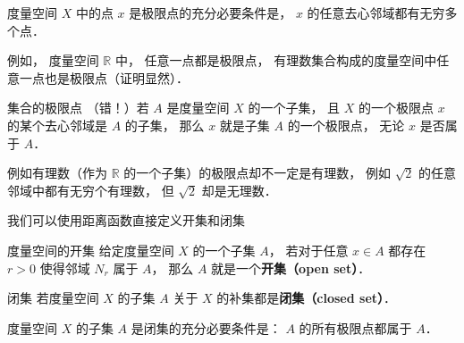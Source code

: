 \begin{corollary}{}
度量空间 $X$ 中的点 $x$ 是极限点的充分必要条件是， $x$ 的任意去心邻域都有无穷多个点．
\end{corollary}

例如， 度量空间 $\mathbb R$ 中， 任意一点都是极限点， 有理数集合构成的度量空间中任意一点也是极限点（证明显然）．

\begin{definition}{集合的极限点}
（错！）若 $A$ 是度量空间 $X$ 的一个子集， 且 $X$ 的一个极限点 $x$ 的某个去心邻域是 $A$ 的子集， 那么 $x$ 就是子集 $A$ 的一个极限点， 无论 $x$ 是否属于 $A$．
\end{definition}
例如有理数（作为 $\mathbb R$ 的一个子集）的极限点却不一定是有理数， 例如 $\sqrt{2}$ 的任意邻域中都有无穷个有理数， 但 $\sqrt{2}$ 却是无理数．

我们可以使用距离函数直接定义开集和闭集
\begin{definition}{度量空间的开集}
给定度量空间 $X$ 的一个子集 $A$， 若对于任意 $x \in A$ 都存在 $r > 0$ 使得邻域 $N_r$ 属于 $A$， 那么 $A$ 就是一个\textbf{开集（open set）}．
\end{definition}

\begin{definition}{闭集}
若度量空间 $X$ 的子集 $A$ 关于 $X$ 的补集都是\textbf{闭集（closed set）}．
\end{definition}

\begin{theorem}{}
度量空间 $X$ 的子集 $A$ 是闭集的充分必要条件是： $A$ 的所有极限点都属于 $A$．
\end{theorem}

